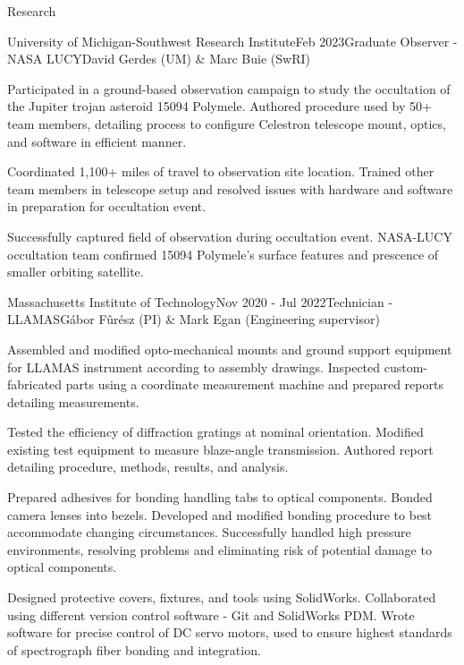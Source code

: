 \documentclass{resume} %
\begin{document}
\begin{rSection}{Research}
\begin{rSubsection}{University of Michigan-Southwest Research Institute}{Feb 2023}{Graduate Observer - NASA LUCY}{David Gerdes (UM) \& Marc Buie (SwRI)}
    \item Participated in a ground-based observation campaign to study the occultation of the Jupiter trojan asteroid 15094 Polymele. Authored procedure used by 50+ team members, detailing process to configure Celestron telescope mount, optics, and software in efficient manner.
    \item Coordinated 1,100+ miles of travel to observation site location. Trained other team members in telescope setup and resolved issues with hardware and software in preparation for occultation event.
    \item Successfully captured field of observation during occultation event. NASA-LUCY occultation team confirmed 15094 Polymele's surface features and prescence of smaller orbiting satellite.
\end{rSubsection}
\newpage
\begin{rSubsection}{Massachusetts Institute of Technology}{Nov 2020 - Jul 2022}{Technician - LLAMAS}{G\'abor F\^ur\'esz (PI) \& Mark Egan (Engineering supervisor)}
\item Assembled and modified opto-mechanical mounts and ground support equipment for LLAMAS instrument according to assembly drawings. Inspected custom-fabricated parts using a coordinate measurement machine and prepared reports detailing measurements.
\item Tested the efficiency of diffraction gratings at nominal orientation. Modified existing test equipment to measure blaze-angle transmission. Authored report detailing procedure, methods, results, and analysis.
\item Prepared  adhesives for bonding handling tabs to optical components. Bonded camera lenses into bezels. Developed and modified bonding procedure to best accommodate changing circumstances. Successfully handled high pressure environments, resolving problems and eliminating risk of potential damage to optical components.
\item Designed protective covers, fixtures, and tools using SolidWorks. Collaborated using different version control software - Git and SolidWorks PDM. Wrote software for precise control of DC servo motors, used to ensure highest standards of spectrograph fiber bonding and integration.
\end{rSubsection}


\end{rSection}
\end{document}
